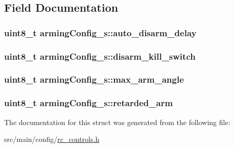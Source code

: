 \subsection{Field Documentation}
\hypertarget{structarmingConfig__s_af351a405ac9eec7106a9a2869df4f489}{
\subsubsection[{auto\+\_\+disarm\+\_\+delay}]{\setlength{\rightskip}{0pt plus 5cm}uint8\+\_\+t arming\+Config\+\_\+s\+::auto\+\_\+disarm\+\_\+delay}}\label{structarmingConfig__s_af351a405ac9eec7106a9a2869df4f489}
\hypertarget{structarmingConfig__s_a6b61ba9e0a5b2fa77aed58129c747100}{
\subsubsection[{disarm\+\_\+kill\+\_\+switch}]{\setlength{\rightskip}{0pt plus 5cm}uint8\+\_\+t arming\+Config\+\_\+s\+::disarm\+\_\+kill\+\_\+switch}}\label{structarmingConfig__s_a6b61ba9e0a5b2fa77aed58129c747100}
\hypertarget{structarmingConfig__s_a1fda417cbd7d2449f0015afeb8fe7073}{
\subsubsection[{max\+\_\+arm\+\_\+angle}]{\setlength{\rightskip}{0pt plus 5cm}uint8\+\_\+t arming\+Config\+\_\+s\+::max\+\_\+arm\+\_\+angle}}\label{structarmingConfig__s_a1fda417cbd7d2449f0015afeb8fe7073}
\hypertarget{structarmingConfig__s_a288dfd22c89e7f164fdb779b4f251628}{
\subsubsection[{retarded\+\_\+arm}]{\setlength{\rightskip}{0pt plus 5cm}uint8\+\_\+t arming\+Config\+\_\+s\+::retarded\+\_\+arm}}\label{structarmingConfig__s_a288dfd22c89e7f164fdb779b4f251628}


The documentation for this struct was generated from the following file\+:\begin{DoxyCompactItemize}
\item 
src/main/config/\hyperlink{rc__controls_8h}{rc\+\_\+controls.\+h}\end{DoxyCompactItemize}
